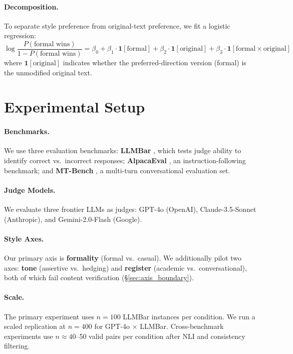 \documentclass[11pt,a4paper]{article}
\begin{document}
\paragraph{Decomposition.}
To separate style preference from original-text preference, we fit a logistic regression:
\begin{equation}
    \log\frac{P(\text{formal wins})}{1 - P(\text{formal wins})} = \beta_0 + \beta_1 \cdot \mathbf{1}[\text{formal}] + \beta_2 \cdot \mathbf{1}[\text{original}] + \beta_3 \cdot \mathbf{1}[\text{formal} \times \text{original}]
\end{equation}
where $\mathbf{1}[\text{original}]$ indicates whether the preferred-direction version (formal) is the unmodified original text.

\section{Experimental Setup}

\paragraph{Benchmarks.}
We use three evaluation benchmarks: \textbf{LLMBar} \citep{llmbar2024}, which tests judge ability to identify correct vs.\ incorrect responses; \textbf{AlpacaEval} \citep{li2024alpacaeval}, an instruction-following benchmark; and \textbf{MT-Bench} \citep{zheng2024chatbot}, a multi-turn conversational evaluation set.

\paragraph{Judge Models.}
We evaluate three frontier LLMs as judges: GPT-4o (OpenAI), Claude-3.5-Sonnet (Anthropic), and Gemini-2.0-Flash (Google).

\paragraph{Style Axes.}
Our primary axis is \textbf{formality} (formal vs.\ casual). We additionally pilot two axes: \textbf{tone} (assertive vs.\ hedging) and \textbf{register} (academic vs.\ conversational), both of which fail content verification (\S\ref{sec:axis_boundary}).

\paragraph{Scale.}
The primary experiment uses $n=100$ LLMBar instances per condition. We run a scaled replication at $n=400$ for GPT-4o $\times$ LLMBar. Cross-benchmark experiments use $n \approx 40$--50 valid pairs per condition after NLI and consistency filtering.
\end{document}
